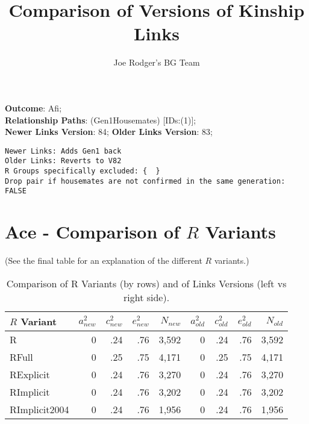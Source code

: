 \documentclass{article}\usepackage[]{graphicx}\usepackage[]{color}
\title{Comparison of Versions of Kinship Links}
\author{Joe Rodger's BG Team}
\makeatletter
\newenvironment{kframe}{%
 \def\at@end@of@kframe{}%
 \ifinner\ifhmode%
  \def\at@end@of@kframe{\end{minipage}}%
  \begin{minipage}{\columnwidth}%
 \fi\fi%
 \def\FrameCommand##1{\hskip\@totalleftmargin \hskip-\fboxsep
 \colorbox{shadecolor}{##1}\hskip-\fboxsep
     \hskip-\linewidth \hskip-\@totalleftmargin \hskip\columnwidth}%
 \MakeFramed {\advance\hsize-\width
   \@totalleftmargin\z@ \linewidth\hsize
   \@setminipage}}%
 {\par\unskip\endMakeFramed%
 \at@end@of@kframe}
\newenvironment{knitrout}{}{} %
\makeatother
\begin{document}
\maketitle
\setcounter{totalnumber}{8} %

\setlength{\parindent}{0pt}%











\textbf{Outcome}: Afi;\\
\textbf{Relationship Paths}: (Gen1Housemates) [IDs:(1)];\\
\textbf{Newer Links Version}: 84;
\textbf{Older Links Version}: 83;

\begin{knitrout}
\color{fgcolor}\begin{kframe}
\begin{verbatim}
Newer Links: Adds Gen1 back
Older Links: Reverts to V82
R Groups specifically excluded: {  }
Drop pair if housemates are not confirmed in the same generation: FALSE
\end{verbatim}
\end{kframe}
\end{knitrout}





\section{Ace - Comparison of $R$ Variants} 
(See the final table for an explanation of the different $R$ variants.)
\begin{table}[ht]
\centering
{\large
\begin{tabular}{l|rrrr|rrrr}
  \hline
$R$ Variant & $a_{new}^2$ & $c_{new}^2$ & $e_{new}^2$ & $N_{new}$ & $a_{old}^2$ & $c_{old}^2$ & $e_{old}^2$ & $N_{old}$ \\ 
  \hline
R & 0 & .24 & .76 & 3,592 & 0 & .24 & .76 & 3,592 \\ 
  RFull & 0 & .25 & .75 & 4,171 & 0 & .25 & .75 & 4,171 \\ 
  RExplicit & 0 & .24 & .76 & 3,270 & 0 & .24 & .76 & 3,270 \\ 
  RImplicit & 0 & .24 & .76 & 3,202 & 0 & .24 & .76 & 3,202 \\ 
  RImplicit2004 & 0 & .24 & .76 & 1,956 & 0 & .24 & .76 & 1,956 \\ 
   \hline
\end{tabular}
}
\caption{Comparison of R Variants (by rows) and of Links Versions (left vs right side).} 
\end{table}
\end{document}
